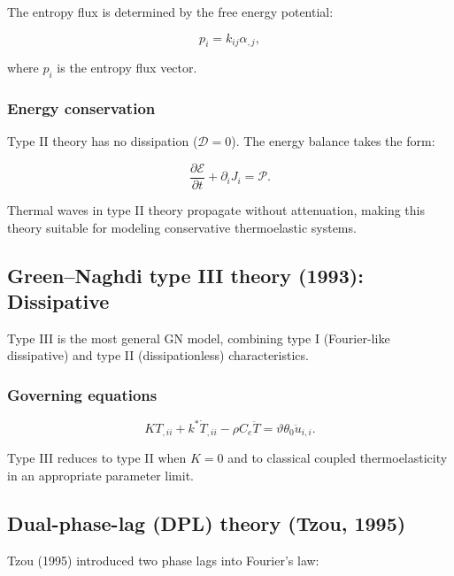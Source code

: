 The entropy flux is determined by the free energy potential:

\begin{equation}
p_i = k_{ij}\alpha_{,j},
\label{eq:4.12}
\end{equation}

where $p_i$ is the entropy flux vector.

\subsubsection{Energy conservation}

Type II theory has no dissipation ($\mathcal{D} = 0$). The energy balance takes the form:

\begin{equation}
\frac{\partial\mathcal{E}}{\partial t} + \partial_i J_i = \mathcal{P}.
\label{eq:4.13}
\end{equation}

Thermal waves in type II theory propagate without attenuation, making this theory suitable for modeling conservative thermoelastic systems.

\subsection{Green--Naghdi type III theory (1993): Dissipative}
\label{sec:4.6}

Type III is the most general GN model, combining type I (Fourier-like dissipative) and type II (dissipationless) characteristics.

\subsubsection{Governing equations}

\begin{equation}
K T_{,ii} + k^*\dot{T}_{,ii} - \rho C_e\ddot{T} = \vartheta\theta_0\ddot{u}_{i,i}.
\label{eq:4.14}
\end{equation}

Type III reduces to type II when $K = 0$ and to classical coupled thermoelasticity in an appropriate parameter limit.

\subsection{Dual-phase-lag (DPL) theory (Tzou, 1995)}
\label{sec:4.7}

Tzou (1995) introduced two phase lags into Fourier's law:

